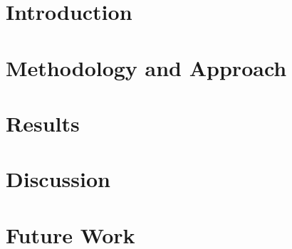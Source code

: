 \section{Introduction}



\section{Methodology and Approach}

\section{Results}


\section{Discussion}

\section{Future Work}


%
